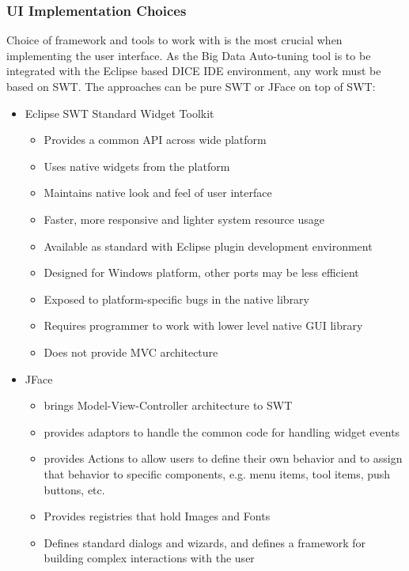 \subsubsection{UI Implementation Choices}
Choice of framework and tools to work with is the most crucial when implementing the user interface. As the Big Data Auto-tuning tool is to be integrated with the Eclipse based DICE IDE environment, any work must be based on SWT. The approaches can be pure SWT or JFace on top of SWT:
\begin{itemize}
\item Eclipse SWT Standard Widget Toolkit \cite{swt}
	\begin{itemize}
	\item Provides a common API across wide platform
    \item Uses native widgets from the platform
    \item Maintains native look and feel of user interface
    \item Faster, more responsive and lighter system resource usage
    \item Available as standard with Eclipse plugin development environment
    \item Designed for Windows platform, other ports may be less efficient
    \item Exposed to platform-specific bugs in the native library
    \item Requires programmer to work with lower level native GUI library
    \item Does not provide MVC architecture
	\end{itemize}
\item JFace \cite{jface}
	\begin{itemize}
    \item brings Model-View-Controller architecture to SWT
	\item provides adaptors to handle the common code for handling widget events
	\item provides Actions to allow users to define their own behavior and to assign that behavior to specific components, e.g. menu items, tool items, push buttons, etc.
	\item Provides registries that hold Images and Fonts
	\item Defines standard dialogs and wizards, and defines a framework for building complex interactions with the user
	\end{itemize}
\end{itemize}
